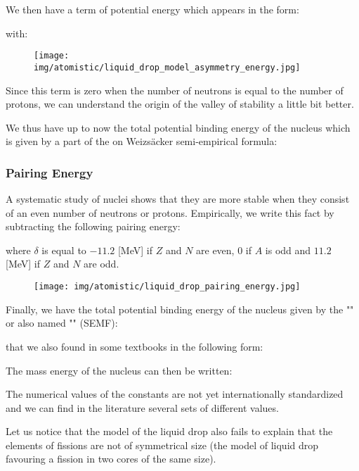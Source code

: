	We then have a term of potential energy which appears in the form:
	
	with:
	
	\begin{figure}[H]
		\centering
		\texttt{[image: img/atomistic/liquid\_drop\_model\_asymmetry\_energy.jpg]}
	\end{figure}
	Since this term is zero when the number of neutrons is equal to the number of protons, we can understand the origin of the valley of stability a little bit better.
	
	We thus have up to now the total potential binding energy of the nucleus which is given by a part of the on Weizsäcker semi-empirical formula:
	
	
	\subsubsection{Pairing Energy}
	A systematic study of nuclei shows that they are more stable when they consist of an even number of neutrons or protons. Empirically, we write this fact by subtracting the following pairing energy:
	
	where $\delta$ is equal to $-11.2$ [MeV] if $Z$ and $N$ are even, $0$ if $A$ is odd and $11.2$ [MeV] if $Z$ and $N$ are odd.
	\begin{figure}[H]
		\centering
		\texttt{[image: img/atomistic/liquid\_drop\_pairing\_energy.jpg]}
	\end{figure}
	Finally, we have the total potential binding energy of the nucleus given by the "" or also named "" (SEMF):
	
	that we also found in some textbooks in the following form:
	
	The mass energy of the nucleus can then be written:
	
	\begin{tcolorbox}[title=Remark,colframe=black,arc=10pt]
	The numerical values of the constants are not yet internationally standardized and we can find in the literature several sets of different values.
	\end{tcolorbox}
	Let us notice that the model of the liquid drop also fails to explain that the elements of fissions are not of symmetrical size (the model of liquid drop favouring a fission in two cores of the same size).

